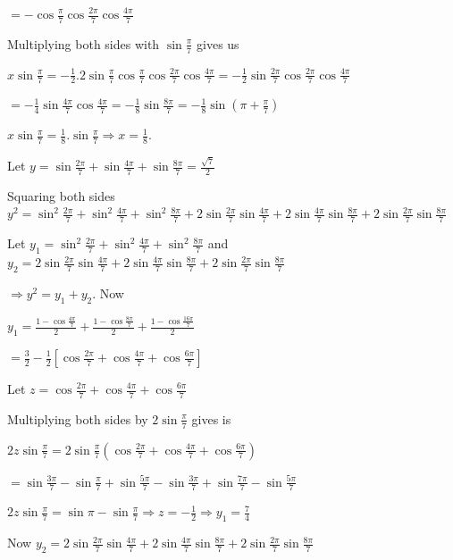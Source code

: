   $= -\cos\frac{\pi}{7}\cos\frac{2\pi}{7}\cos\frac{4\pi}{7}$

  Multiplying both sides with $\sin\frac{\pi}{7}$ gives us

  $x\sin\frac{\pi}{7} = -\frac{1}{2}.2\sin\frac{\pi}{7}\cos\frac{\pi}{7}\cos\frac{2\pi}{7}\cos\frac{4\pi}{7}
  = -\frac{1}{2}\sin\frac{2\pi}{7}\cos\frac{2\pi}{7}\cos\frac{4\pi}{7}$

  $= -\frac{1}{4}\sin\frac{4\pi}{7}\cos\frac{4\pi}{7} = -\frac{1}{8}\sin\frac{8\pi}{7} =
  -\frac{1}{8}\sin\left(\pi + \frac{\pi}{7}\right)$

  $x\sin\frac{\pi}{7} = \frac{1}{8}.\sin\frac{\pi}{7}\Rightarrow x = \frac{1}{8}$.
\item Let $y = \sin\frac{2\pi}{7} + \sin\frac{4\pi}{7} + \sin\frac{8\pi}{7} = \frac{\sqrt{7}}{2}$

  Squaring both sides $y^2 = \sin^2\frac{2\pi}{7} + \sin^2\frac{4\pi}{7} + \sin^2\frac{8\pi}{7} +
  2\sin\frac{2\pi}{7}\sin\frac{4\pi}{7} + 2\sin\frac{4\pi}{7}\sin\frac{8\pi}{7} +
  2\sin\frac{2\pi}{7}\sin\frac{8\pi}{7}$

  Let $y_1 = \sin^2\frac{2\pi}{7} + \sin^2\frac{4\pi}{7} + \sin^2\frac{8\pi}{7}$ and $y_2 =
  2\sin\frac{2\pi}{7}\sin\frac{4\pi}{7} + 2\sin\frac{4\pi}{7}\sin\frac{8\pi}{7} +
  2\sin\frac{2\pi}{7}\sin\frac{8\pi}{7}$

  $\Rightarrow y^2 = y_1 + y_2$. Now

  $y_1 = \frac{1 - \cos\frac{4\pi}{7}}{2} + \frac{1 - \cos\frac{8\pi}{7}}{2} + \frac{1
    - \cos\frac{16\pi}{7}}{2}$

  $= \frac{3}{2} - \frac{1}{2}\left[\cos\frac{2\pi}{7} + \cos\frac{4\pi}{7} + \cos\frac{6\pi}{7}\right]$

  Let $z = \cos\frac{2\pi}{7} + \cos\frac{4\pi}{7} + \cos\frac{6\pi}{7}$

  Multiplying both sides by $2\sin\frac{\pi}{7}$ gives is

  $2z\sin\frac{\pi}{7} = 2\sin\frac{\pi}{7}\left(\cos\frac{2\pi}{7} + \cos\frac{4\pi}{7}
  + \cos\frac{6\pi}{7}\right)$

  $= \sin\frac{3\pi}{7} - \sin\frac{\pi}{7} + \sin\frac{5\pi}{7} - \sin\frac{3\pi}{7} + \sin\frac{7\pi}{7} -
  \sin\frac{5\pi}{7}$

  $2z\sin\frac{\pi}{7} = \sin\pi - \sin\frac{\pi}{7} \Rightarrow z = -\frac{1}{2}\Rightarrow y_1
  = \frac{7}{4}$

  Now $y_2 = 2\sin\frac{2\pi}{7}\sin\frac{4\pi}{7} + 2\sin\frac{4\pi}{7}\sin\frac{8\pi}{7} +
  2\sin\frac{2\pi}{7}\sin\frac{8\pi}{7}$

